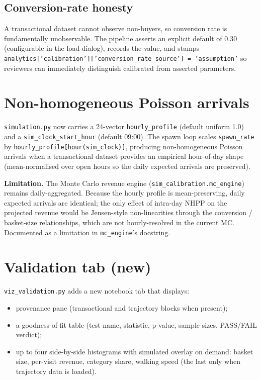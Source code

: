 \documentclass[11pt]{article}
\begin{document}
\subsection{Conversion-rate honesty}

A transactional dataset cannot observe non-buyers, so conversion
rate is fundamentally unobservable. The pipeline asserts an
explicit default of 0.30 (configurable in the load dialog),
records the value, and stamps
\texttt{analytics['calibration']['conversion\_rate\_source']\,=\,'assumption'}
so reviewers can immediately distinguish calibrated from asserted
parameters.

\section{Non-homogeneous Poisson arrivals}
\label{sec:nhpp}

\texttt{simulation.py} now carries a 24-vector
\texttt{hourly\_profile} (default uniform 1.0) and a
\texttt{sim\_clock\_start\_hour} (default 09:00). The spawn loop
scales \texttt{spawn\_rate} by
\texttt{hourly\_profile[hour(sim\_clock)]}, producing
non-homogeneous Poisson arrivals when a transactional dataset
provides an empirical hour-of-day shape (mean-normalised over open
hours so the daily expected arrivals are preserved).

\textbf{Limitation.} The Monte Carlo revenue engine
(\texttt{sim\_calibration.mc\_engine}) remains daily-aggregated.
Because the hourly profile is mean-preserving, daily expected
arrivals are identical; the only effect of intra-day NHPP on the
projected revenue would be Jensen-style non-linearities through
the conversion / basket-size relationships, which are not
hourly-resolved in the current MC. Documented as a limitation in
\texttt{mc\_engine}'s docstring.

\section{Validation tab (new)}
\label{sec:val-tab}

\texttt{viz\_validation.py} adds a new notebook tab that
displays:
\begin{itemize}[leftmargin=*]
  \item provenance pane (transactional and trajectory blocks
    when present);
  \item a goodness-of-fit table (test name, statistic, p-value,
    sample sizes, PASS/FAIL verdict);
  \item up to four side-by-side histograms with simulated overlay
    on demand: basket size, per-visit revenue, category share,
    walking speed (the last only when trajectory data is loaded).
\end{itemize}
\end{document}
